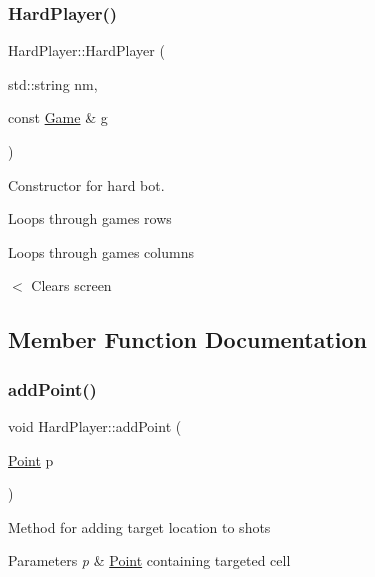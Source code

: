 \subsubsection{\texorpdfstring{Hard\+Player()}{HardPlayer()}}
{\footnotesize\ttfamily Hard\+Player\+::\+Hard\+Player (\begin{DoxyParamCaption}\item[{std\+::string}]{nm,  }\item[{const \mbox{\hyperlink{class_game}{Game}} \&}]{g }\end{DoxyParamCaption})\hspace{0.3cm}{\ttfamily [inline]}}



Constructor for hard bot. 

Loops through game\textquotesingle{}s rows

Loops through games columns

$<$ Clears screen 

\subsection{Member Function Documentation}
\mbox{\label{class_hard_player_a77c82c1a36c9e956fdab98837ed888e5}} 
\subsubsection{\texorpdfstring{add\+Point()}{addPoint()}}
{\footnotesize\ttfamily void Hard\+Player\+::add\+Point (\begin{DoxyParamCaption}\item[{\mbox{\hyperlink{class_point}{Point}}}]{p }\end{DoxyParamCaption})\hspace{0.3cm}{\ttfamily [virtual]}}

Method for adding target location to shots 
\begin{DoxyParams}{Parameters}
{\em p} & \mbox{\hyperlink{class_point}{Point}} containing targeted cell \\
\hline
\end{DoxyParams}
\mbox{\label{class_hard_player_a8107a94c8db7d5f1023dbeeddfaaedb2}} 
